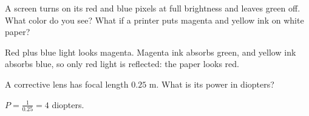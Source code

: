 
\begin{Exercise}[title={Mixing light}, label=eye_mix]
A screen turns on its red and blue pixels at full brightness and leaves
green off. What color do you see? What if a printer puts magenta and
yellow ink on white paper?
\end{Exercise}
\begin{Answer}[ref=eye_mix]
Red plus blue light looks magenta. Magenta ink absorbs green, and yellow
ink absorbs blue, so only red light is reflected: the paper looks red.
\end{Answer}

\begin{Exercise}[title={Stronger Lens}, label=eye1]
A corrective lens has focal length $0.25$ m. What is its power in diopters?
\end{Exercise}
\begin{Answer}[ref=eye1]
$P = \frac{1}{0.25} = 4$ diopters.
\end{Answer}

